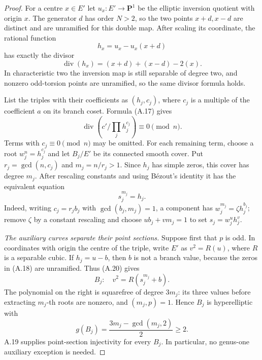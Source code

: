 \begin{proof}
For a centre $x\in E'$ let $u_x:E'\to\mathbf P^1$ be the
elliptic inversion quotient with origin $x$. The generator
$d$ has order $N>2$, so the two points $x+d,x-d$ are distinct
and are unramified for this double map. After scaling its
coordinate, the rational function
\[
 h_x=u_x-u_x(x+d)
\]
has exactly the divisor
\[
 \operatorname{div}(h_x)=(x+d)+(x-d)-2(x).                  \tag{A.18}
\]
In characteristic two the inversion map is still separable
of degree two, and nonzero odd-torsion points are unramified,
so the same divisor formula holds.

List the triples with their coefficients as $(h_j,c_j)$,
where $c_j$ is a multiple of the coefficient $a$ on its
branch coset. Formula (A.17) gives
\[
 \operatorname{div}\left(c'\Big/\prod_jh_j^{c_j}\right)
                         \equiv0\pmod n.                 \tag{A.19}
\]
Terms with $c_j\equiv0\pmod n$ may be omitted. For each
remaining term, choose a root
$w_j^n=h_j^{c_j}$ and let $B_j/E'$ be its connected smooth
cover. Put $r_j=\gcd(n,c_j)$ and $m_j=n/r_j>1$.
Since $h_j$ has simple zeros, this cover has degree $m_j$.
After rescaling constants and using B\'ezout's identity it
has the equivalent equation
\[
 s_j^{m_j}=h_j.                                           \tag{A.20}
\]
Indeed, writing $c_j=r_jb_j$ with $\gcd(b_j,m_j)=1$, a
component has $w_j^{m_j}=\zeta h_j^{b_j}$; remove $\zeta$
by a constant rescaling and choose $u b_j+v m_j=1$ to set
$s_j=w_j^u h_j^v$.

\emph{The auxiliary curves separate their point sections.}
Suppose first that $p$ is odd. In coordinates with origin
the centre of the triple, write $E'$ as
$v^2=R(u)$, where $R$ is a separable cubic. If
$h_j=u-b$, then $b$ is not a branch value, because the zeros
in (A.18) are unramified. Thus (A.20) gives
\[
 B_j:\quad v^2=R(s_j^{m_j}+b).
\]
The polynomial on the right is squarefree of degree $3m_j$:
its three values before extracting $m_j$-th roots are
nonzero, and $(m_j,p)=1$. Hence $B_j$ is hyperelliptic with
\[
 g(B_j)=\frac{3m_j-\gcd(m_j,2)}2\ge2.
\]
A.19 supplies point-section injectivity for every $B_j$.
In particular, no genus-one auxiliary exception is needed.


\end{proof}
